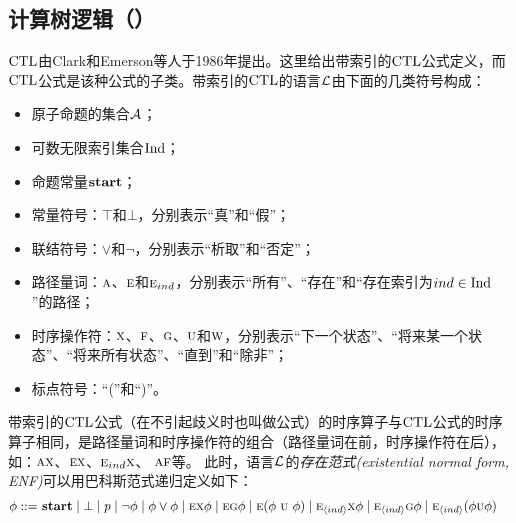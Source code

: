 \subsection{计算树逻辑（\CTL）}
$\textrm{CTL}$由Clark和Emerson等人于1986年提出\cite{DBLP:journals/toplas/ClarkeES86}。这里给出带索引的$\textrm{CTL}$公式定义，而$\textrm{CTL}$公式是该种公式的子类。带索引的$\textrm{CTL}$的语言${\cal L}$由下面的几类符号构成：
\begin{itemize}
	\item 原子命题的集合${\cal A}$；
	\item 可数无限索引集合$\textrm{Ind}$；
	\item 命题常量$\textbf{start}$；
	\item 常量符号：$\top$和$\bot$，分别表示“真”和“假”；
	\item 联结符号：$\vee$和$\neg$，分别表示“析取”和“否定”；
	\item 路径量词：$\textsc{a}$、$\textsc{e}$和$\textsc{e}_{ind}$，分别表示“所有”、“存在”和“存在索引为$ind\in \textrm{Ind}$”的路径；
	\item 时序操作符：$\textsc{x}$、$\textsc{f}$、$\textsc{g}$、$\textsc{u}$和$\textsc{w}$，分别表示“下一个状态”、“将来某一个状态”、“将来所有状态”、“直到”和“除非”；
	\item 标点符号：“(”和“)”。
\end{itemize}
带索引的$\textrm{CTL}$公式（在不引起歧义时也叫做公式）的时序算子与$\textrm{CTL}$公式的时序算子相同，是路径量词和时序操作符的组合（路径量词在前，时序操作符在后），如：$\textsc{a} \textsc{x}$、$\textsc{e} \textsc{x}$、$\textsc{e}_{ind} \textsc{x}$、 $\textsc{a} \textsc{f}$等。
此时，语言$\cal L$的\emph{存在范式(existential normal form, ENF)}可以用巴科斯范式递归定义如下：
	\begin{align*}
	\phi  ::= & \ \start\mid \bot %
	\mid p \mid\neg\phi \mid \phi\lor\phi \mid
	\EXIST \NEXT \phi \mid
	\EXIST \GLOBAL \phi \mid
	\EXIST (\phi\ \UNTILL\ \phi)\mid
	\EXIST_{\tuple{ind}}\NEXT \phi  \mid
	\EXIST_{\tuple{ind}}\GLOBAL \phi \mid
	\EXIST_{\tuple{ind}}(\phi \UNTILL \phi) %
\end{align*}

